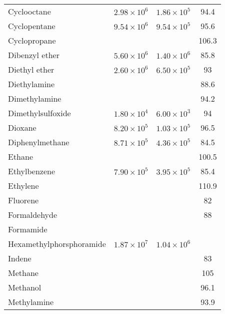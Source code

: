 \begin{longtable}{l | c c c}
 Cyclooctane                    & $ 2.98 \times 10^6$ & $1.86 \times 10^5 $ &      94.4 \\
 Cyclopentane                   & $ 9.54 \times 10^6$ & $9.54 \times 10^5 $ &      95.6 \\
 Cyclopropane                   &                &                &     106.3 \\
 Dibenzyl ether                 & $ 5.60 \times 10^6$ & $1.40 \times 10^6 $ &      85.8 \\
 Diethyl ether                  & $ 2.60 \times 10^6$ & $6.50 \times 10^5 $ &        93 \\
 Diethylamine                   &                &                &      88.6 \\
 Dimethylamine                  &                &                &      94.2 \\
 Dimethylsulfoxide              & $ 1.80 \times 10^4$ & $6.00 \times 10^3 $ &        94 \\
 Dioxane                        & $ 8.20 \times 10^5$ & $1.03 \times 10^5 $ &      96.5 \\
 Diphenylmethane                & $ 8.71 \times 10^5$ & $4.36 \times 10^5 $ &      84.5 \\
 Ethane                         &                &                &     100.5 \\
 Ethylbenzene                   & $ 7.90 \times 10^5$ & $3.95 \times 10^5 $ &      85.4 \\
 Ethylene                       &                &                &     110.9 \\
 Fluorene                       &                &                &        82 \\
 Formaldehyde                   &                &                &        88 \\
 Formamide                      &                &                &           \\
 Hexamethylphorsphoramide       & $ 1.87 \times 10^7$ & $1.04 \times 10^6 $ &           \\
 Indene                         &                &                &        83 \\
 Methane                        &                &                &       105 \\
 Methanol                       &                &                &      96.1 \\
 Methylamine                    &                &                &      93.9 \\

\end{longtable}
